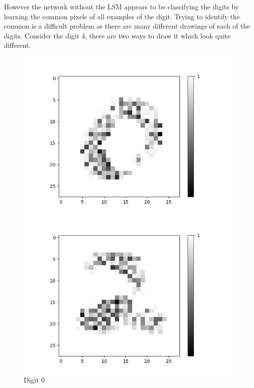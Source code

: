 However the network without the LSM appears to be classifying the digits by learning the common pixels of all examples of the digit. Trying to identify the common is a difficult problem as there are many different drawings of each of the digits. Consider the digit 4, there are two ways to draw it which look quite different.


\begin{figure}[H]
	\captionsetup{labelformat=empty}
	\centering
	\begin{minipage}[b]{0.19\textwidth}
		\includegraphics[width=\textwidth]{AND-OLD(LSM)/Layer0-Neuron-0.png}
		\caption{Digit 0}
	\end{minipage}
	\begin{minipage}[b]{0.19\textwidth}
		\includegraphics[width=\textwidth]{AND-OLD(LSM)/Layer0-Neuron-2.png}

\end{minipage}
\end{figure}
